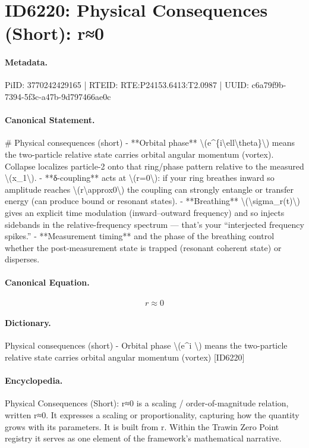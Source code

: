 \section*{ID6220: Physical Consequences (Short): r≈0}
\paragraph{Metadata.}
PiID: 3770242429165 | RTEID: RTE:P24153.6413:T2.0987 | UUID: c6a79f9b-7394-5f3c-a47b-9d797466ae0c

\paragraph{Canonical Statement.}
\# Physical consequences (short) - **Orbital phase** \textbackslash{}(e\textasciicircum{}\{i\textbackslash{}ell\textbackslash{}theta\}\textbackslash{}) means the two-particle relative state carries orbital angular momentum (vortex). Collapse localizes particle-2 onto that ring/phase pattern relative to the measured \textbackslash{}(x\_1\textbackslash{}). - **δ-coupling** acts at \textbackslash{}(r=0\textbackslash{}): if your ring breathes inward so amplitude reaches \textbackslash{}(r\textbackslash{}approx0\textbackslash{}) the coupling can strongly entangle or transfer energy (can produce bound or resonant states). - **Breathing** \textbackslash{}(\textbackslash{}sigma\_r(t)\textbackslash{}) gives an explicit time modulation (inward–outward frequency) and so injects sidebands in the relative-frequency spectrum — that’s your “interjected frequency spikes.” - **Measurement timing** and the phase of the breathing control whether the post-measurement state is trapped (resonant coherent state) or disperses.

\paragraph{Canonical Equation.}
\[
r\approx0
\]

\paragraph{Dictionary.}
Physical consequences (short) - Orbital phase \textbackslash{}(e\textasciicircum{}i \textbackslash{}) means the two-particle relative state carries orbital angular momentum (vortex) [ID6220]

\paragraph{Encyclopedia.}
Physical Consequences (Short): r≈0 is a scaling / order-of-magnitude relation, written r≈0. It expresses a scaling or proportionality, capturing how the quantity grows with its parameters. It is built from r. Within the Trawin Zero Point registry it serves as one element of the framework's mathematical narrative.
